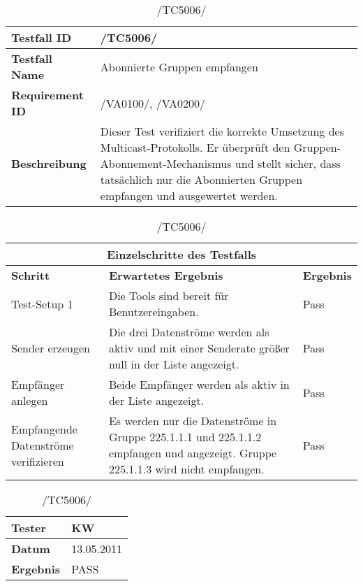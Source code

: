     \begin{table}[h]
        \caption{/TC5006/}
        \label{tab:TC5006}
        \begin{center}
            \begin{tabular}{|p{3.5cm}|p{11cm}|}
                \hline
                    \textbf{Testfall ID} & /TC5006/\\
                \hline
                    \textbf{Testfall Name} & Abonnierte Gruppen empfangen
                    \\
                \hline
                    \textbf{Requirement ID} & /VA0100/, /VA0200/\\
                \hline
                    \textbf{Beschreibung} &  Dieser Test verifiziert die
                    korrekte Umsetzung des Multicast-Protokolls. Er überprüft
                    den Gruppen-Abonnement-Mechanismus und stellt sicher, dass
                    tatsächlich nur die Abonnierten Gruppen empfangen und
                    ausgewertet werden.\\
                \hline
            \end{tabular}
            \begin{tabular}{|p{4cm}|p{7.8cm}|p{2.3cm}|}
\multicolumn{3}{|c|}{\textbf{Einzelschritte des Testfalls}} \\
                \hline
                    \textbf{Schritt} & \textbf{Erwartetes Ergebnis} & \textbf{Ergebnis}\\
                \hline
                    Test-Setup 1 &
                    Die Tools sind bereit für Benutzereingaben.& Pass\\
                \hline
                    Sender erzeugen &
                    Die drei Datenströme werden als aktiv und mit einer
                    Senderate größer null in der Liste angezeigt.& Pass\\
                \hline
                    Empfänger anlegen &
                    Beide Empfänger werden als aktiv in der Liste angezeigt.& Pass\\
                \hline
                    Empfangende Datenströme verifizieren &
                    Es werden nur die Datenströme in Gruppe 225.1.1.1 und
                    225.1.1.2 empfangen und angezeigt. Gruppe 225.1.1.3 wird
                    nicht empfangen.& Pass\\
                \hline
            \end{tabular}
                   \begin{tabular}{|p{3.5cm}|p{11cm}|}
                \textbf{Tester} & KW\\
                \hline
                \textbf{Datum} & 13.05.2011\\
                \hline
                \textbf{Ergebnis} & PASS\\
                \hline
            \end{tabular}
        \end{center}
    \end{table}
